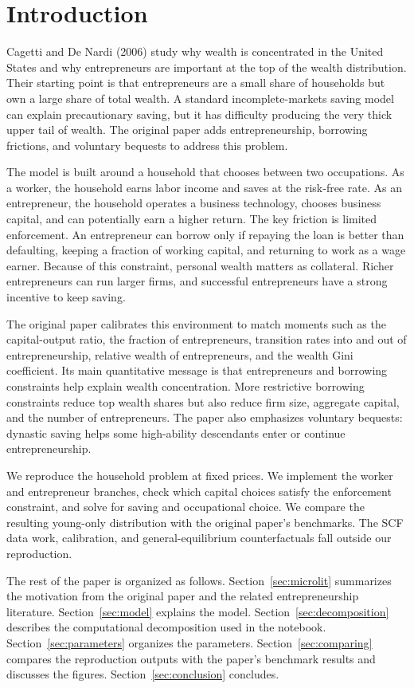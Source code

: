 \documentclass[\latexroot/\projectname]{subfiles}
\begin{document}
\section{Introduction}
\whenintegrated{\label{sec:intro}}
\setcounter{page}{0}

Cagetti and De Nardi (2006) study why wealth is concentrated in the United States and why entrepreneurs are important at the top of the wealth distribution. Their starting point is that entrepreneurs are a small share of households but own a large share of total wealth. A standard incomplete-markets saving model can explain precautionary saving, but it has difficulty producing the very thick upper tail of wealth. The original paper adds entrepreneurship, borrowing frictions, and voluntary bequests to address this problem.

The model is built around a household that chooses between two occupations. As a worker, the household earns labor income and saves at the risk-free rate. As an entrepreneur, the household operates a business technology, chooses business capital, and can potentially earn a higher return. The key friction is limited enforcement. An entrepreneur can borrow only if repaying the loan is better than defaulting, keeping a fraction of working capital, and returning to work as a wage earner. Because of this constraint, personal wealth matters as collateral. Richer entrepreneurs can run larger firms, and successful entrepreneurs have a strong incentive to keep saving.

The original paper calibrates this environment to match moments such as the capital-output ratio, the fraction of entrepreneurs, transition rates into and out of entrepreneurship, relative wealth of entrepreneurs, and the wealth Gini coefficient. Its main quantitative message is that entrepreneurs and borrowing constraints help explain wealth concentration. More restrictive borrowing constraints reduce top wealth shares but also reduce firm size, aggregate capital, and the number of entrepreneurs. The paper also emphasizes voluntary bequests: dynastic saving helps some high-ability descendants enter or continue entrepreneurship.

We reproduce the household problem at fixed prices. We implement the worker and entrepreneur branches, check which capital choices satisfy the enforcement constraint, and solve for saving and occupational choice. We compare the resulting young-only distribution with the original paper's benchmarks. The SCF data work, calibration, and general-equilibrium counterfactuals fall outside our reproduction.

The rest of the paper is organized as follows. Section~\ref{sec:microlit} summarizes the motivation from the original paper and the related entrepreneurship literature. Section~\ref{sec:model} explains the model. Section~\ref{sec:decomposition} describes the computational decomposition used in the notebook. Section~\ref{sec:parameters} organizes the parameters. Section~\ref{sec:comparing} compares the reproduction outputs with the paper's benchmark results and discusses the figures. Section~\ref{sec:conclusion} concludes.

\smartbib
\end{document}
